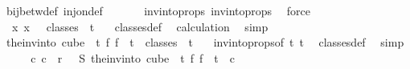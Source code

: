 \begin{isabellebody}
\ bij{\isacharunderscore}{\kern0pt}betw{\isacharunderscore}{\kern0pt}def\ inj{\isacharunderscore}{\kern0pt}on{\isacharunderscore}{\kern0pt}def\ \isanewline
\ \ \ \ \isamarkupfalse%
\ invintoprops{\isacharparenleft}{\kern0pt}{}{\isacharparenright}{\kern0pt}\ invintoprops{\isacharparenleft}{\kern0pt}{}{\isacharparenright}{\kern0pt}\ \isamarkupfalse%
\ force\ \isanewline
\ \ \isamarkupfalse%
\ \isamarkupfalse%
\ {\isacharasterisk}{\kern0pt}{\isacharasterisk}{\kern0pt}{\isacharcolon}{\kern0pt}\ {\isachardoublequoteopen}{\isasymexists}{\isacharbang}{\kern0pt}x{\isachardot}{\kern0pt}\ x\ \ {\isasymin}\ classes\ {}\ t\ {}{\isachardoublequoteclose}\ \isamarkupfalse%
\ classes{\isacharunderscore}{\kern0pt}def\ \isamarkupfalse%
\ calculation{\isacharparenleft}{\kern0pt}{}{\isacharparenright}{\kern0pt}\ \isamarkupfalse%
\ simp\isanewline
\ \ \isamarkupfalse%
\ \isamarkupfalse%
\ {\isachardoublequoteopen}the{\isacharunderscore}{\kern0pt}inv{\isacharunderscore}{\kern0pt}into\ {\isacharparenleft}{\kern0pt}cube\ {}\ {\isacharparenleft}{\kern0pt}t{\isacharplus}{\kern0pt}{}{\isacharparenright}{\kern0pt}{\isacharparenright}{\kern0pt}\ {\isacharparenleft}{\kern0pt}{\isasymlambda}f{\isachardot}{\kern0pt}\ f\ {}{\isacharparenright}{\kern0pt}\ t\ {\isasymin}\ classes\ {}\ t\ {}{\isachardoublequoteclose}\ \isamarkupfalse%
\ invintoprops{\isacharbrackleft}{\kern0pt}of\ t\ {\isachardoublequoteopen}t{\isacharplus}{\kern0pt}{}{\isachardoublequoteclose}{\isacharbrackright}{\kern0pt}\ \isamarkupfalse%
\ classes{\isacharunderscore}{\kern0pt}def\ \isamarkupfalse%
\ simp\isanewline
\isanewline
\ \ \isamarkupfalse%
\ \isamarkupfalse%
\ {\isachardoublequoteopen}{\isasymexists}c{}{\isachardot}{\kern0pt}\ c{}\ {\isacharless}{\kern0pt}\ r\ {\isasymand}\ {\isasymchi}\ {\isacharparenleft}{\kern0pt}S\ {\isacharparenleft}{\kern0pt}the{\isacharunderscore}{\kern0pt}inv{\isacharunderscore}{\kern0pt}into\ {\isacharparenleft}{\kern0pt}cube\ {}\ {\isacharparenleft}{\kern0pt}t{\isacharplus}{\kern0pt}{}{\isacharparenright}{\kern0pt}{\isacharparenright}{\kern0pt}\ {\isacharparenleft}{\kern0pt}{\isasymlambda}f{\isachardot}{\kern0pt}\ f\ {}{\isacharparenright}{\kern0pt}\ t{\isacharparenright}{\kern0pt}{\isacharparenright}{\kern0pt}\ {\isacharequal}{\kern0pt}\ c{}{\isachardoublequoteclose}\ \isamarkupfalse%

\end{isabellebody}

